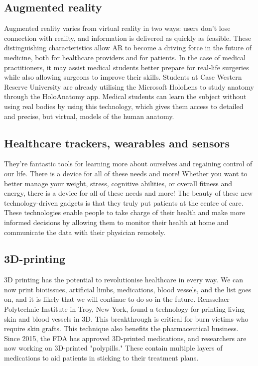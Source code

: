 \documentclass[12pt]{article}
\begin{document}
\subsection{Augmented reality}
Augmented reality varies from virtual reality in two ways: users don't lose connection with reality, and information is delivered as quickly as feasible. These distinguishing characteristics allow AR to become a driving force in the future of medicine, both for healthcare providers and for patients. In the case of medical practitioners, it may assist medical students better prepare for real-life surgeries while also allowing surgeons to improve their skills. Students at Case Western Reserve University are already utilising the Microsoft HoloLens to study anatomy through the HoloAnatomy app. Medical students can learn the subject without using real bodies by using this technology, which gives them access to detailed and precise, but virtual, models of the human anatomy.
\subsection{Healthcare trackers, wearables and sensors}
They're fantastic tools for learning more about ourselves and regaining control of our life. There is a device for all of these needs and more! Whether you want to better manage your weight, stress, cognitive abilities, or overall fitness and energy, there is a device for all of these needs and more! The beauty of these new technology-driven gadgets is that they truly put patients at the centre of care. These technologies enable people to take charge of their health and make more informed decisions by allowing them to monitor their health at home and communicate the data with their physician remotely.
\subsection{3D-printing}
3D printing has the potential to revolutionise healthcare in every way. We can now print biotissues, artificial limbs, medications, blood vessels, and the list goes on, and it is likely that we will continue to do so in the future. Rensselaer Polytechnic Institute in Troy, New York, found a technology for printing living skin and blood vessels in 3D. This breakthrough is critical for burn victims who require skin grafts. This technique also benefits the pharmaceutical business. Since 2015, the FDA has approved 3D-printed medications, and researchers are now working on 3D-printed "polypills." These contain multiple layers of medications to aid patients in sticking to their treatment plans.
\end{document}
